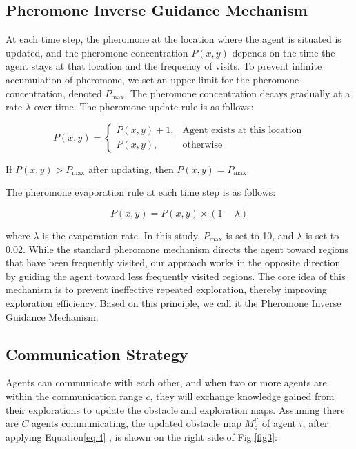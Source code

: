 \documentclass[lettersize,journal]{IEEEtran}
\begin{document}
\subsection{Pheromone Inverse Guidance Mechanism}

At each time step, the pheromone at the location where the agent is situated is updated, and the pheromone concentration \( P(x,y) \) depends on the time the agent stays at that location and the frequency of visits. To prevent infinite accumulation of pheromone, we set an upper limit for the pheromone concentration, denoted \( P_{\text{max}} \). The pheromone concentration decays gradually at a rate \( \lambda \) over time. The pheromone update rule is as follows:

\begin{equation}
P(x,y) = \begin{cases}
P(x,y) + 1, & \text{Agent exists at this location} \\
P(x,y), & \text{otherwise}
\end{cases}
\end{equation}

If \( P(x,y) > P_{\text{max}} \) after updating, then \( P(x,y) = P_{\text{max}} \).

The pheromone evaporation rule at each time step is as follows:

\begin{equation}
P(x,y) = P(x,y) \times (1 - \lambda)
\end{equation}

where \( \lambda \) is the evaporation rate. In this study, \( P_{\text{max}} \) is set to 10, and \( \lambda \) is set to 0.02. While the standard pheromone mechanism directs the agent toward regions that have been frequently visited, our approach works in the opposite direction by guiding the agent toward less frequently visited regions. The core idea of this mechanism is to prevent ineffective repeated exploration, thereby improving exploration efficiency. Based on this principle, we call it the Pheromone Inverse Guidance Mechanism.
\subsection{Communication Strategy}
Agents can communicate with each other, and when two or more agents are within the communication range \( c \), they will exchange knowledge gained from their explorations to update the obstacle and exploration maps. Assuming there are \( C \) agents communicating, the updated obstacle map \( M_o^{i' } \) of agent \( i \), after applying Equation\ref{eq:4} , is shown on the right side of Fig.\ref{fig3}:
\end{document}
